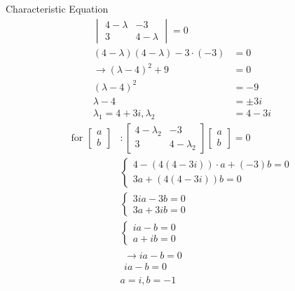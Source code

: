 \documentclass[10pt, letterpaper]{article}
\begin{document}
Characteristic Equation
\begin{align*}
\begin{vmatrix}
	4-\lambda & -3\\
	3 & 4-\lambda
\end{vmatrix} = 0\\
(4-\lambda)(4-\lambda)-3\cdot(-3) &= 0\\
\rightarrow (\lambda-4)^2+9 &= 0\\
(\lambda-4)^2 &= -9\\
\lambda-4 &= \pm 3i\\
\lambda_1=4+3i, \lambda_2 &= 4-3i
\end{align*}
\begin{align*}
\text{for } \begin{bmatrix}
	a\\
	b
\end{bmatrix} &: \begin{bmatrix}
	4-\lambda_2 & -3\\
	3 & 4-\lambda_2
\end{bmatrix} \begin{bmatrix}
	a\\
	b
\end{bmatrix} = 0\\
&\begin{cases}
	4-(4(4-3i))\cdot a+(-3)b=0\\
	3a+(4(4-3i))b=0
\end{cases}\\
&\begin{cases}
	3ia-3b=0\\
	3a+3ib=0
\end{cases}\\
&\begin{cases}
	ia-b=0\\
	a+ib=0
\end{cases}\\
&\begin{matrix}
	\rightarrow ia-b=0\\
	ia-b=0
\end{matrix}\\
&a=i, b=-1
\end{align*}
\end{document}
